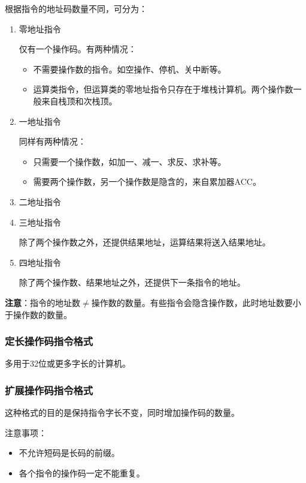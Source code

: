 \documentclass[12pt, a4paper, oneside]{ctexart}
\begin{document}
根据指令的地址码数量不同，可分为：
\begin{enumerate}
  \item {\kaishu 零地址指令}
  
  仅有一个操作码。有两种情况：
  \begin{itemize}
    \item 不需要操作数的指令。如空操作、停机、关中断等。
    \item 运算类指令，但运算类的零地址指令只存在于堆栈计算机。两个操作数一般来自栈顶和次栈顶。
  \end{itemize}
  \item {\kaishu 一地址指令}
  
  同样有两种情况：
  \begin{itemize}
    \item 只需要一个操作数，如加一、减一、求反、求补等。
    \item 需要两个操作数，另一个操作数是隐含的，来自累加器ACC。
  \end{itemize}
  \item {\kaishu 二地址指令}
  \item {\kaishu 三地址指令}
  
  除了两个操作数之外，还提供结果地址，运算结果将送入结果地址。
  \item {\kaishu 四地址指令}
  
  除了两个操作数、结果地址之外，还提供下一条指令的地址。
\end{enumerate}

\textbf{注意}：指令的地址数$\neq$操作数的数量。有些指令会隐含操作数，此时地址数要小于操作数的数量。

\subsubsection{定长操作码指令格式}

多用于32位或更多字长的计算机。

\subsubsection{扩展操作码指令格式}

这种格式的目的是保持指令字长不变，同时增加操作码的数量。

注意事项：
\begin{itemize}
  \item 不允许短码是长码的前缀。
  \item 各个指令的操作码一定不能重复。
\end{itemize}
\end{document}
